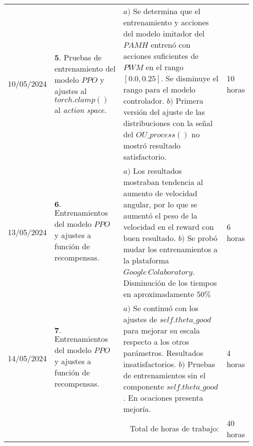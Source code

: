\documentclass[12pt]{article}
\begin{document}
\hfill\\
\begin{minipage}[h]{\textwidth}
	\centering
	\begin{tabularx}{\textwidth}{|p{2cm}|X|X|p{2cm}|} 
		\hline		

		  10/05/2024 & 
	 	$\mathbf{5}.$ Pruebas de entrenamiento del modelo $PPO$ y ajustes al $torch.clamp()$ al \textit{action space}. &
	 	$a)$ Se determina que el entrenamiento y acciones del modelo imitador del $PAMH$ entrenó con acciones suficientes de $PWM$ en el rango $[0.0, 0.25]$. Se disminuye el rango para el modelo controlador. \newline
	 	$b)$ Primera versión del ajuste de las distribuciones con la señal del $OU\_process()$ no mostró resultado satisfactorio. \newline & 
	 	10 horas \\
	 	13/05/2024 & 
	 	$\mathbf{6}.$ Entrenamientos del modelo $PPO$ y ajustes a función de recompensas. &
	 	$a)$ Los resultados mostraban tendencia al aumento de velocidad angular, por lo que se aumentó el peso de la velocidad en el reward con buen  resultado. \newline
            $b)$ Se probó mudar los entrenamientos a la plataforma $Google\, Colaboratory$. Disminución de los tiempos en aproximadamente $50\%$ \newline &
	 	6 horas \\
	 	14/05/2024 & 
	 	$\mathbf{7}.$ Entrenamientos del modelo $PPO$ y ajustes a función de recompensas. &
	 	$a)$ Se continuó con los ajustes de $self.theta\_good$ para mejorar su escala respecto a los otros parámetros. Resultados insatisfactorios. \newline
            $b)$ Pruebas de entrenamientos sin el componente $self.theta\_good$. En ocaciones presenta mejoría. \newline & 
	 	4 horas \\
	 	
	 	\hline
		\multicolumn{3}{|r|}{Total de horas de trabajo:} & 40 horas \\ 
	 	\hline                 
	\end{tabularx}
\end{minipage}
\end{document}
